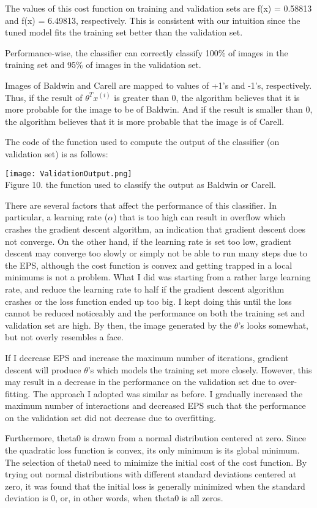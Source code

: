 \documentclass{article}
\begin{document}
\par The values of this cost function on training and validation sets are f(x) = 0.58813 and f(x) = 6.49813, respectively. This is consistent with our intuition since the tuned model fits the training set better than the validation set.
\par Performance-wise, the classifier can correctly classify 100\% of images in the training set and 95\% of images in the validation set.
\par Images of Baldwin and Carell are mapped to values of +1's and -1's, respectively. Thus, if the result of $\theta^{T}x^{(i)}$ is greater than 0, the algorithm believes that it is more probable for the image to be of Baldwin. And if the result is smaller than 0, the algorithm believes that it is more probable that the image is of Carell.
\par The code of the function used to compute the output of the classifier (on validation set) is as follows:
\begin{center}
\texttt{[image: ValidationOutput.png]}\\
Figure 10. the function used to classify the output as Baldwin or Carell.
\end{center}
\par There are several factors that affect the performance of this classifier. In particular, a learning rate ($\alpha$) that is too high can result in overflow which crashes the gradient descent algorithm, an indication that gradient descent does not converge. On the other hand, if the learning rate is set too low, gradient descent may converge too slowly or simply not be able to run many steps due to the EPS, although the cost function is convex and getting trapped in a local minimums is not a problem. What I did was starting from a rather large learning rate, and reduce the learning rate to half if the gradient descent algorithm crashes or the loss function ended up too big. I kept doing this until the loss cannot be reduced noticeably and the performance on both the training set and validation set are high. By then, the image generated by the $\theta$'s looks somewhat, but not overly resembles a face.
\par If I decrease EPS and increase the maximum number of iterations, gradient descent will produce $\theta$'s which models the training set more closely. However, this may result in a decrease in the performance on the validation set due to over-fitting. The approach I adopted was similar as before. I gradually increased the maximum number of interactions and decreased EPS such that the performance on the validation set did not decrease due to overfitting.
\par Furthermore, theta0 is drawn from a normal distribution centered at zero. Since the quadratic loss function is convex, its only minimum is its global minimum. The selection of theta0 need to minimize the initial cost of the cost function. By trying out normal distributions with different standard deviations centered at zero, it was found that the initial loss is generally minimized when the standard deviation is 0, or, in other words, when theta0 is all zeros.
\end{document}
